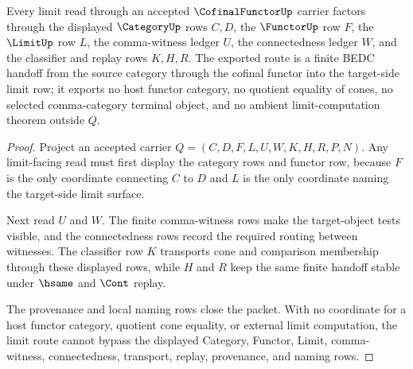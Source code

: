 \begin{theorem}
\label{thm:cofinal-functor-limit-route}
Every limit read through an accepted $\CofinalFunctorUp$ carrier factors through the displayed $\CategoryUp$ rows $C,D$, the $\FunctorUp$ row $F$, the $\LimitUp$ row $L$, the comma-witness ledger $U$, the connectedness ledger $W$, and the classifier and replay rows $K,H,R$. The exported route is a finite BEDC handoff from the source category through the cofinal functor into the target-side limit row; it exports no host functor category, no quotient equality of cones, no selected comma-category terminal object, and no ambient limit-computation theorem outside $Q$.
\end{theorem}
\begin{proof}
Project an accepted carrier $Q=(C,D,F,L,U,W,K,H,R,P,N)$. Any limit-facing read must first display the category rows and functor row, because $F$ is the only coordinate connecting $C$ to $D$ and $L$ is the only coordinate naming the target-side limit surface.

Next read $U$ and $W$. The finite comma-witness rows make the target-object tests visible, and the connectedness rows record the required routing between witnesses. The classifier row $K$ transports cone and comparison membership through these displayed rows, while $H$ and $R$ keep the same finite handoff stable under $\hsame$ and $\Cont$ replay.

The provenance and local naming rows close the packet. With no coordinate for a host functor category, quotient cone equality, or external limit computation, the limit route cannot bypass the displayed Category, Functor, Limit, comma-witness, connectedness, transport, replay, provenance, and naming rows.
\end{proof}


\begin{closurestatus}{\CofinalFunctorUp}
  \theoryclosure{\seedClosure}
  \formalstatus{\formalTargetV}
\end{closurestatus}
